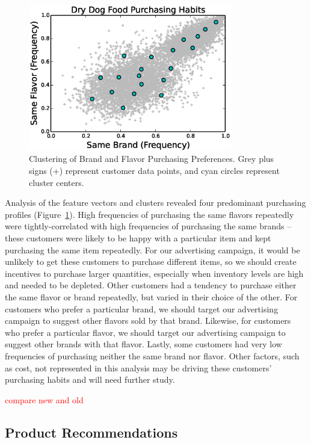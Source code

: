 \documentclass[conference]{IEEEtran}
\begin{document}
\begin{figure}[!t]
  \centering
  \includegraphics[width=3.5in]{figures/cluster_analysis.eps}
  \caption{Clustering of Brand and Flavor Purchasing Preferences. Grey plus signs (+) represent customer data points, and cyan circles represent cluster centers.}
  \label{fig:cluster_analysis}
\end{figure}

Analysis of the feature vectors and clusters revealed four predominant purchasing profiles (Figure~\ref{fig:cluster_analysis}).  High frequencies of purchasing the same flavors repeatedly were tightly-correlated with high frequencies of purchasing the same brands -- these customers were likely to be happy with a particular item and kept purchasing the same item repeatedly.  For our advertising campaign, it would be unlikely to get these customers to purchase different items, so we should create incentives to purchase larger quantities, especially when inventory levels are high and needed to be depleted.  Other customers had a tendency to purchase either the same flavor or brand repeatedly, but varied in their choice of the other.  For customers who prefer a particular brand, we should target our advertising campaign to suggest other flavors sold by that brand.  Likewise, for customers who prefer a particular flavor, we should target our advertising campaign to suggest other brands with that flavor.  Lastly, some customers had very low frequencies of purchasing neither the same brand nor flavor.  Other factors, such as cost, not represented in this analysis may be driving these customers' purchasing habits and will need further study.

\textcolor{red}{compare new and old}

\subsection{Product Recommendations}
\end{document}
